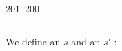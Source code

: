 201~200~\documentclass{article}
\begin{document}
\begin{lstlisting}[language=Python, caption=Signature for Chall 3]
	                                                                        	                                                                    	                                	                    	                    	                        	                        	                    	                                                                	                	                                                                    	                    							                                                                                                                                                                                                    		                                                                                                                        \end{lstlisting}


	                                                                        	                                                                    	                                	                    	                    	                        	                        	                    	                                                                	                	                                                                    	                    							                                                                                                                                                                                                    		                                                                                                                        We define an $s$ and an $s'$ :
\end{document}
